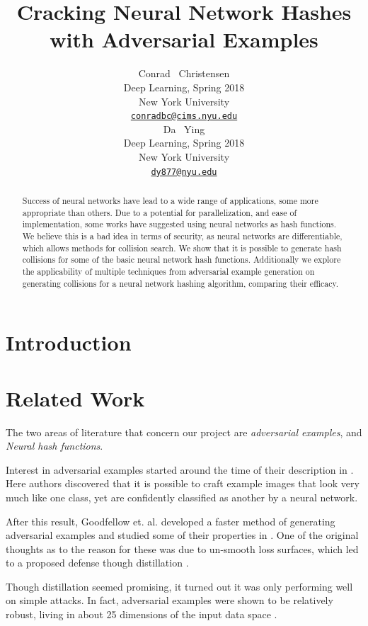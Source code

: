 \documentclass{article}
\title{Cracking Neural Network Hashes with Adversarial Examples}
\author{
  Conrad ~Christensen\\
  Deep Learning, Spring 2018\\
  New York University\\
  \href{mailto:conradbc@cims.nyu.edu}{\texttt{conradbc@cims.nyu.edu}} \\
  \And
  Da ~Ying\\
  Deep Learning, Spring 2018\\
  New York University\\
  \href{mailto:dy877@nyu.edu}{\texttt{dy877@nyu.edu}}
}
\begin{document}

\maketitle

\begin{abstract}
    Success of neural networks have lead to a wide range of applications, some
    more appropriate than others. Due to a potential for parallelization, and
    ease of implementation, some works have suggested using neural networks as
    hash functions.  We believe this is a bad idea in terms of security, as
    neural networks are differentiable, which allows methods for collision
    search. We show that it is possible to generate hash collisions for some of
    the basic neural network hash functions. Additionally we explore the
    applicability of multiple techniques from adversarial example generation on
    generating collisions for a neural network hashing algorithm, comparing
    their efficacy.
\end{abstract}

\section{Introduction}

\section{Related Work}

The two areas of literature that concern our project are \emph{adversarial examples},
and \emph{Neural hash functions}.

Interest in adversarial examples started around the time of their description
in \cite{intriguing}. Here authors discovered that it is possible to craft
example images that look very much like one class, yet are confidently classified
as another by a neural network.

After this result, Goodfellow et. al. developed a faster method of generating
adversarial examples and studied some of their properties in \cite{explaining}.
One of the original thoughts as to the reason for these was due to un-smooth 
loss surfaces, which led to a proposed defense though distillation \cite{distil}.

Though distillation seemed promising, it turned out it was only performing well
on simple attacks. In fact, adversarial examples were shown to be relatively
robust, living in about 25 dimensions of the input data space \cite{space}.
\end{document}
